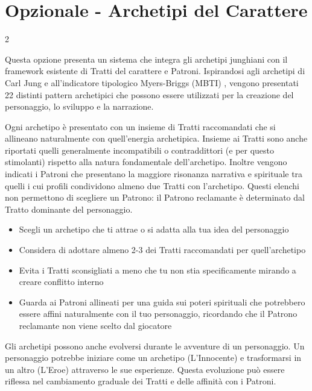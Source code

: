 \section{Opzionale - Archetipi del Carattere}\label{archetipi}\hypertarget{archetipi}{}

\begin{multicols}{2}

Questa opzione presenta un sistema che integra gli archetipi junghiani \autocite{jung1971} con il framework esistente di Tratti del carattere e Patroni. Ispirandosi agli archetipi di Carl Jung e all'indicatore tipologico Myers-Briggs (MBTI) \autocite{myers1995}, vengono presentati 22 distinti pattern archetipici che possono essere utilizzati per la creazione del personaggio, lo sviluppo e la narrazione.

Ogni archetipo è presentato con un insieme di Tratti raccomandati che si allineano naturalmente con quell'energia archetipica. Insieme ai Tratti sono anche riportati quelli generalmente incompatibili o contraddittori (e per questo stimolanti) rispetto alla natura fondamentale dell'archetipo. Inoltre vengono indicati i Patroni che presentano la maggiore risonanza narrativa e spirituale tra quelli i cui profili condividono almeno due Tratti con l'archetipo. Questi elenchi non permettono di scegliere un Patrono: il Patrono reclamante è determinato dal Tratto dominante del personaggio.

\begin{itemize}
\item Scegli un archetipo che ti attrae o si adatta alla tua idea del personaggio
\item Considera di adottare almeno 2-3 dei Tratti raccomandati per quell'archetipo
\item Evita i Tratti sconsigliati a meno che tu non stia specificamente mirando a creare conflitto interno
\item Guarda ai Patroni allineati per una guida sui poteri spirituali che potrebbero essere affini naturalmente con il tuo personaggio, ricordando che il Patrono reclamante non viene scelto dal giocatore
\end{itemize}

Gli archetipi possono anche evolversi durante le avventure di un personaggio. Un personaggio potrebbe iniziare come un archetipo (L'Innocente) e trasformarsi in un altro (L'Eroe) attraverso le sue esperienze. Questa evoluzione può essere riflessa nel cambiamento graduale dei Tratti e delle affinità con i Patroni.


\end{multicols}

